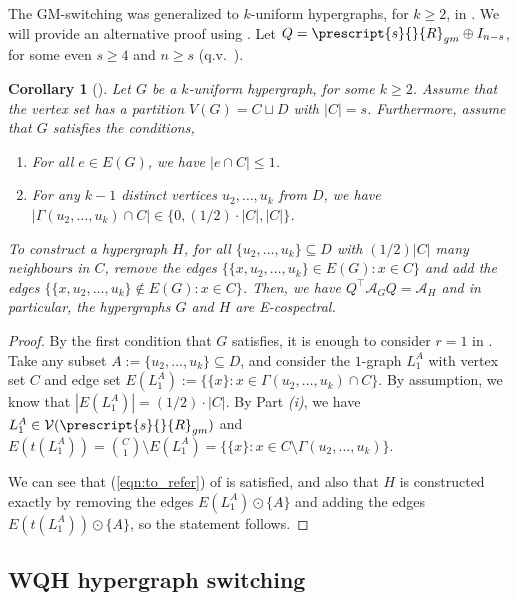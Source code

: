 \documentclass[12pt]{article}
\numberwithin{equation}{section}
\newtheorem{corollary}[theorem]{Corollary}
\theoremstyle{definition}
\newcommand{\ev}[1]{( #1 )}
\begin{document}
The GM-switching was generalized to $k$-uniform hypergraphs, for $k\geq 2$, in \cite[Theorem 3.1, p.~4]{bzw2014}. We will provide an alternative proof using . Let $Q = \prescript{s}{}{R}_{gm} \oplus I_{n-s}$, for some even $s\geq 4$ and $n\geq s$ (q.v.~).
\begin{corollary}[\cite{bzw2014}]
\label{cor:E_gm_switch}
Let $G$ be a $k$-uniform hypergraph, for some $k\geq 2$. Assume that the vertex set has a partition $V\ev{G} = C \sqcup D$ with $|C|=s$. Furthermore, assume that $G$ satisfies the conditions,
\begin{enumerate}
\item For all $e\in E\ev{G}$, we have $|e \cap C|\leq 1$. 
\item For any $k-1$ distinct vertices $u_2,\ldots, u_k$ from $D$, we have $|\Gamma\ev{ u_2,\ldots, u_k } \cap C| \in \{ 0, (1/2)\cdot |C|, |C| \}$.
\end{enumerate}
To construct a hypergraph $H$, for all $\{ u_2, \ldots, u_k \} \subseteq D$ with $ (1/2)|C| $ many neighbours in $C$, remove the edges $\{ \{ x, u_2,\ldots,u_k\} \in E\ev{G} : x\in C\}$ and add the edges $\{ \{ x, u_2,\ldots,u_k\} \notin E\ev{G}: x\in C \} $. Then, we have $Q^\top \mathcal{A}_G Q = \mathcal{A}_H$ and in particular, the hypergraphs $G$ and $H$ are E-cospectral. 
\end{corollary} 
\begin{proof}
By the first condition that $G$ satisfies, it is enough to consider $r=1$ in . Take any subset $A := \{ u_2, \ldots, u_k \} \subseteq D$, and consider the $1$-graph $L_1^{A}$ with vertex set $C$ and edge set $E\ev{L_1^{A}} := \{ \{ x \}: x\in \Gamma\ev{ u_2,\ldots, u_k } \cap C\}$. By assumption, we know that $|E\ev{L_1^{A}}| = (1/2)\cdot |C|$. By  Part \textit{(i)}, we have $L_1^{A} \in \mathcal{V}\ev{\prescript{s}{}{R}_{gm}} $ and $E\ev{ t\ev{ L_1^{A} }} = \binom{C}{1} \setminus E\ev{ L_1^{A} } = \{ \{ x \}: x\in C \setminus \Gamma\ev{ u_2,\ldots, u_k } \} $. %

We can see that (\ref{eqn:to_refer}) of  is satisfied, and also that $H$ is constructed exactly by removing the edges $E\ev{L_1^{A}} \odot \{A\}$ and adding the edges $E\ev{t\ev{ L_1^{A} }} \odot \{A\}$, so the statement follows.
\end{proof}


\subsection{WQH hypergraph switching}
\end{document}
